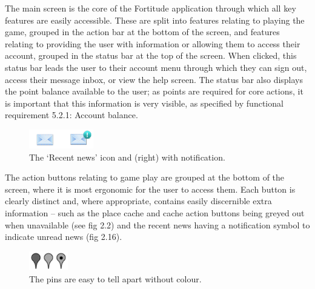 The main screen is the core of the Fortitude application through which all key features are easily accessible. These are split into features relating to playing the game, grouped in the action bar at the bottom of the screen, and features relating to providing the user with information or allowing them to access their account, grouped in the status bar at the top of the screen. When clicked, this status bar leads the user to their account menu through which they can sign out, access their message inbox, or view the help screen. The status bar also displays the point balance available to the user; as points are required for core actions, it is important that this information is very visible, as specified by functional requirement 5.2.1: Account balance.

\begin{figure}
	\vspace{-45pt}
	\begin{center}
	\includegraphics[width=0.25\textwidth]{images/news_icons}
	\caption{The `Recent news' icon and (right) with notification.}
	\label{news_icons}
	\end{center}
	\vspace{15pt}
\end{figure}

The action buttons relating to game play are grouped at the bottom of the screen, where it is most ergonomic for the user to access them. Each button is clearly distinct and, where appropriate, contains easily discernible extra information – such as the place cache and cache action buttons being greyed out when unavailable (see fig 2.2) and the recent news having a notification symbol to indicate unread news (fig 2.16). 

\begin{figure}
	\vspace{-20pt}
	\begin{center}
	\includegraphics[width=0.15\textwidth]{images/grey_pins}
	\caption{The pins are easy to tell apart without colour.}
	\label{grey_pins}
	\end{center}
	\vspace{-20pt}
\end{figure}

